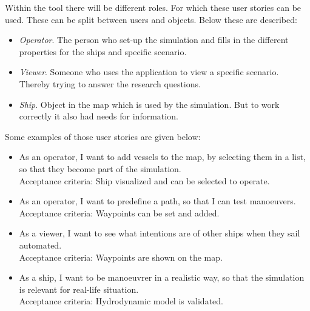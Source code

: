 Within the tool there will be different roles. For which these user stories can be used. These can be split between users and objects. Below these are described:
\begin{itemize}
	\item \emph{Operator}. The person who set-up the simulation and fills in the different properties for the ships and specific scenario.
	\item \emph{Viewer}. Someone who uses the application to view a specific scenario. Thereby trying to answer the research questions.
	\item \emph{Ship}. Object in the map which is used by the simulation. But to work correctly it also had needs for information.
\end{itemize}

Some examples of those user stories are given below:
\begin{itemize}
	\item As an operator, I want to add vessels to the map, by selecting them in a list, so that they become part of the simulation. \\
	Acceptance criteria: Ship visualized and can be selected to operate.
	\item As an operator, I want to predefine a path, so that I can test manoeuvers. \\
	Acceptance criteria: Waypoints can be set and added.
	\item As a viewer, I want to see what intentions are of other ships when they sail automated. \\
	Acceptance criteria: Waypoints are shown on the map.
	\item As a ship, I want to be manoeuvrer in a realistic way, so that the simulation is relevant for real-life situation. \\
	Acceptance criteria: Hydrodynamic model is validated.
\end{itemize}

